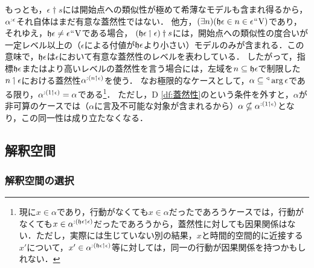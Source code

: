 もっとも，$\epsilon\dagger s$には開始点への類似性が極めて希薄なモデルも含まれ得るから，$\alpha^{:\epsilon}$それ自体はまだ有意な蓋然性ではない．
他方，$(\exists n)(\mathfrak{h}\epsilon\in n\in\epsilon{\mspace{1mu}{``}\mspace{1mu}}\mathrm{V})$であり，それゆえ，$\mathfrak{h}\epsilon \neq \epsilon{\mspace{1mu}{``}\mspace{1mu}}\mathrm{V}$である場合，
$(\mathfrak{h}\epsilon\mathbin{\upharpoonleft}\epsilon)\dagger s$には，開始点への類似性の度合いが一定レベル以上の（$\epsilon$による付値が$\mathfrak{h}\epsilon$より小さい）モデルのみが含まれる．この意味で，$ \mathfrak{h}\epsilon $は$ \epsilon $において有意な蓋然性のレベルを表わしている．
したがって，指標$\mathfrak{h}\epsilon$またはより高いレベルの蓋然性を言う場合には，左域を$n\subseteq\mathfrak{h}\epsilon$で制限した$n\mathbin{\upharpoonleft}\epsilon$における蓋然性$ \alpha^{:(n\mathbin{\upharpoonleft}\epsilon)} $を使う．
なお極限的なケースとして，$ \alpha\subseteq{^\triangleleft}\arg\epsilon $である限り，$ \alpha^{:(1\mathbin{\upharpoonleft}\epsilon)}=\alpha $である\footnote{
    現に$x\in\alpha$であり，行動がなくても$x\in\alpha$だったであろうケースでは，行動がなくても$ x\in\alpha^{:(\mathfrak{h}\epsilon\mathbin{\upharpoonleft}\epsilon)} $だったであろうから，蓋然性に対しても因果関係はない．ただし，実際には生じていない別の結果，$x$と時間的空間的に近接する$x'$について，$x'\in\alpha^{:(\mathfrak{h}\epsilon\mathbin{\upharpoonleft}\epsilon)}$等に対しては，同一の行動が因果関係を持つかもしれない．
}．
ただし，D \ref{df:蓋然性}のという条件を外すと，$\alpha$が非可算のケースでは（$\alpha$に言及不可能な対象が含まれるから）$ \alpha\nsubseteq \alpha^{:(1\mathbin{\upharpoonleft}\epsilon)} $となり，この同一性は成り立たなくなる．

\subsection{解釈空間}
\label{ssec:解釈空間}

\subsubsection{解釈空間の選択}
\label{sssec:解釈空間の選択}

